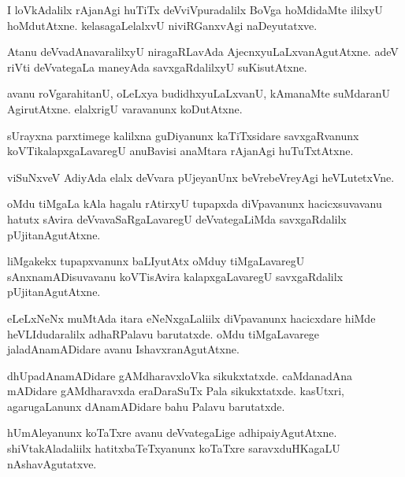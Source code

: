 \documentclass{article}
\begin{document}
\begin{mng}%
I loVkAdalilx rAjanAgi huTiTx deVviVpuradalilx BoVga hoMdidaMte 
ililxyU hoMdutAtxne. kelasagaLelalxvU niviRGanxvAgi naDeyutatxve.
\end{mng}

\begin{mng}%
Atanu deVvadAnavaralilxyU niragaRLavAda AjecnxyuLaLxvanAgutAtxne. adeV 
riVti deVvategaLa maneyAda savxgaRdalilxyU suKisutAtxne.
\end{mng}

\begin{mng}%
avanu roVgarahitanU, oLeLxya budidhxyuLaLxvanU, kAmanaMte suMdaranU 
AgirutAtxne. elalxrigU varavanunx koDutAtxne.
\end{mng}

\begin{mng}%
sUrayxna parxtimege kalilxna guDiyanunx kaTiTxsidare savxgaRvanunx 
koVTikalapxgaLavaregU anuBavisi anaMtara rAjanAgi huTuTxtAtxne.
\end{mng}

\begin{mng}%
viSuNxveV AdiyAda elalx deVvara pUjeyanUnx beVrebeVreyAgi heVLutetxVne.
\end{mng}

\begin{mng}%
oMdu tiMgaLa kAla hagalu rAtirxyU tupapxda diVpavanunx hacicxsuvavanu 
hatutx sAvira deVvavaSaRgaLavaregU deVvategaLiMda savxgaRdalilx 
pUjitanAgutAtxne.
\end{mng}

\begin{mng}%
liMgakekx tupapxvanunx baLIyutAtx oMduy tiMgaLavaregU 
sAnxnamADisuvavanu koVTisAvira kalapxgaLavaregU savxgaRdalilx 
pUjitanAgutAtxne.
\end{mng}

\begin{mng}%
eLeLxNeNx muMtAda itara eNeNxgaLaliilx diVpavanunx hacicxdare hiMde 
heVLIdudaralilx adhaRPalavu barutatxde. oMdu tiMgaLavarege 
jaladAnamADidare avanu IshavxranAgutAtxne.
\end{mng}

\begin{mng}%
dhUpadAnamADidare gAMdharavxloVka sikukxtatxde. caMdanadAna mADidare 
gAMdharavxda eraDaraSuTx Pala sikukxtatxde. kasUtxri, agarugaLanunx 
dAnamADidare bahu Palavu barutatxde.
\end{mng}

\begin{mng}%
hUmAleyanunx koTaTxre avanu deVvategaLige adhipaiyAgutAtxne. 
shiVtakAladaliilx hatitxbaTeTxyanunx koTaTxre saravxduHKagaLU 
nAshavAgutatxve.
\end{mng}
\end{document}

